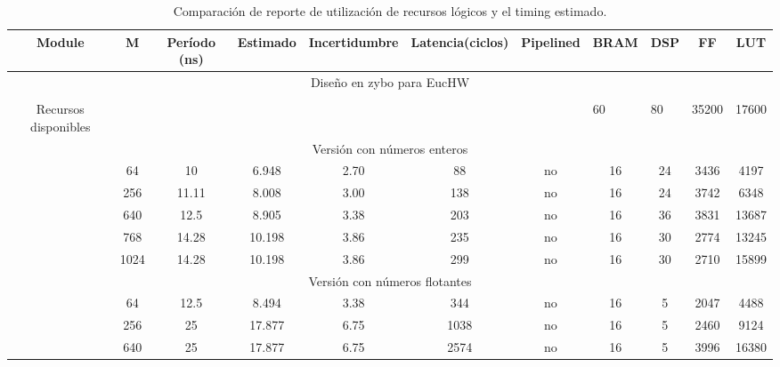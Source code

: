 \documentclass[conference]{IEEEtran}
\begin{document}
\begin{table*}[h]
\caption{Comparación de reporte de  utilización de recursos lógicos  y el timing  estimado.}
\label{tab:my-tablenew}
\begin{tabular}{ccccccccccc}
\hline
Module & M & Período (ns) & Estimado & Incertidumbre & Latencia(ciclos) & Pipelined & BRAM & DSP & FF & LUT \\ \hline
\multicolumn{11}{c}{Diseño en zybo para  EucHW} \\ \hline
\multicolumn{1}{l}{} & \multicolumn{1}{l}{} & \multicolumn{1}{l}{} & \multicolumn{1}{l}{} & \multicolumn{1}{l}{} & \multicolumn{1}{l}{} & \multicolumn{1}{l}{} & \multicolumn{1}{l}{} & \multicolumn{1}{l}{} & \multicolumn{1}{l}{} & \multicolumn{1}{l}{} \\ \hline
Recursos disponibles & \multicolumn{1}{l}{} & \multicolumn{1}{l}{} & \multicolumn{1}{l}{} & \multicolumn{1}{l}{} & \multicolumn{1}{l}{} & \multicolumn{1}{l}{} & \multicolumn{1}{l}{60} & \multicolumn{1}{l}{80} & \multicolumn{1}{l}{35200} & \multicolumn{1}{l}{17600} \\ \hline
\multicolumn{11}{c}{Versión con números enteros} \\ \hline
 & 64 & 10 & 6.948 & 2.70 & 88 & no & 16 & 24 & 3436 & 4197 \\ \hline
 & 256 & 11.11 & 8.008 & 3.00 & 138 & no & 16 & 24 & 3742 & 6348 \\ \hline
 & 640 & 12.5 & 8.905 & 3.38 & 203 & no & 16 & 36 & 3831 & 13687 \\ \hline
  & 768 & 14.28 & 10.198 & 3.86 & 235 & no & 16 & 30 & 2774 & 13245 \\ \hline
& 1024 & 14.28 & 10.198 & 3.86 & 299 & no & 16 & 30 & 2710 & 15899 \\ \hline
\multicolumn{11}{c}{Versión con números flotantes} \\ \hline
 & 64 & 12.5 & 8.494 & 3.38 & 344 & no & 16 & 5 & 2047 & 4488 \\ \hline
 & 256 & 25 & 17.877 & 6.75 & 1038 & no & 16 & 5 & 2460 & 9124 \\ \hline
 & 640 & 25 & 17.877 & 6.75 & 2574 & no & 16 & 5 & 3996 & 16380 \\ \hline
\end{tabular}
\end{table*}
\end{document}
